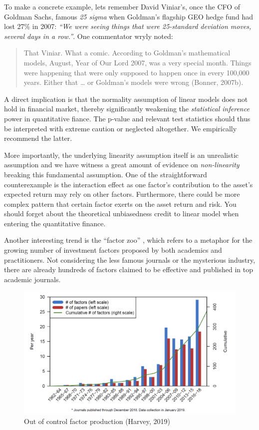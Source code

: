 \documentclass[
]{book}
\begin{document}
To make a concrete example, lets remember David Viniar's, once the CFO of Goldman Sachs, famous {\emph{25 sigma}} when Goldman's flagship GEO hedge fund had lost 27\% in 2007: {\emph{``We were seeing things that were 25-standard deviation moves, several days in a row.''}}. One commentator wryly noted:

\begin{quote}
That Viniar. What a comic. According to Goldman's mathematical models, August, Year of Our Lord 2007, was a very special month. Things were happening that were only supposed to happen once in every 100,000 years. Either that \ldots{} or Goldman's models were wrong (Bonner, 2007b).
\end{quote}

A direct implication is that the normality assumption of linear models does not hold in financial market, thereby significantly weakening the {\emph{statistical inference}} power in quantitative fiance. The p-value and relevant test statistics should thus be interpreted with extreme caution or neglected altogether. We empirically recommend the latter.

More importantly, the underlying linearity assumption itself is an unrealistic assumption and we have witness a great amount of evidence on {\emph{non-linearity}} breaking this fundamental assumption. One of the straightforward counterexample is the interaction effect as one factor's contribution to the asset's expected return may rely on other factors. Furthermore, there could be more complex pattern that certain factor exerts on the asset return and risk. You should forget about the theoretical unbiasedness credit to linear model when entering the quantitative finance.

Another interesting trend is the ``factor zoo'' \citep{harvey2019census}, which refers to a metaphor for the growing number of investment factors proposed by both academics and practitioners. Not considering the less famous journals or the mysterious industry, there are already hundreds of factors claimed to be effective and published in top academic journals.\\

\begin{figure}
\includegraphics[width=0.9\linewidth]{images/chapter3/factor_zoo} \caption{Out of control factor production (Harvey, 2019)}\label{fig:unnamed-chunk-2}
\end{figure}
\end{document}
